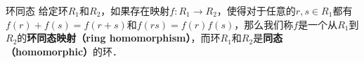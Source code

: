 

\begin{definition}{环同态}
给定环$R_1$和$R_2$，如果存在映射$f:R_1\rightarrow R_2$，使得对于任意的$r, s\in R_1$都有$f(r)+f(s)=f(r+s)$和$f(rs)=f(r)f(s)$，那么我们称$f$是一个从$R_1$到$R_2$的\textbf{环同态映射（ring homomorphism）}，而环$R_1$和$R_2$是\textbf{同态（homomorphic）}的环．
\end{definition}





